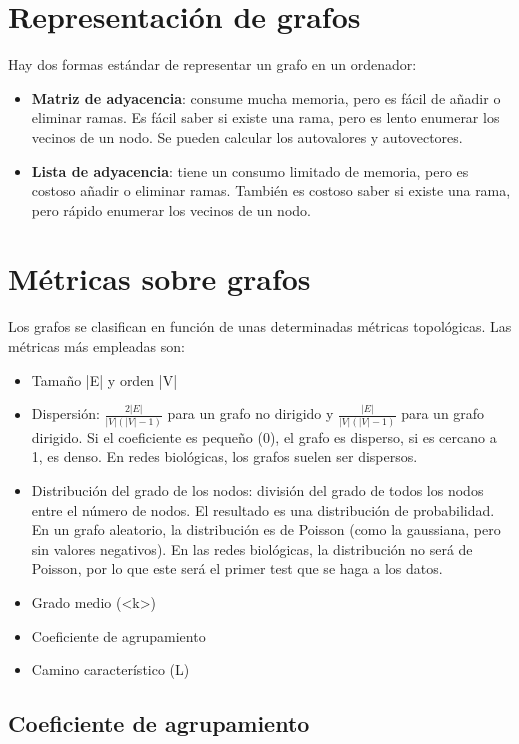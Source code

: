 \section{Representación de grafos}
Hay dos formas estándar de representar un grafo en un ordenador:
\begin{itemize}
\item \textbf{Matriz de adyacencia}: consume mucha memoria, pero es fácil de añadir o eliminar ramas. Es fácil saber si existe una rama, pero es lento enumerar los vecinos de un nodo. Se pueden calcular los autovalores y autovectores.
\item \textbf{Lista de adyacencia}: tiene un consumo limitado de memoria, pero es costoso añadir o eliminar ramas. También es costoso saber si existe una rama, pero rápido enumerar los vecinos de un nodo.
\end{itemize}

\section{Métricas sobre grafos}
Los grafos se clasifican en función de unas determinadas métricas topológicas. Las métricas más empleadas son:
\begin{itemize}
\item Tamaño |E| y orden |V|
\item Dispersión: $\frac{2 |E|}{|V| (|V| - 1)}$ para un grafo no dirigido y $\frac{|E|}{|V| (|V| - 1)}$ para un grafo dirigido. Si el coeficiente es pequeño (0), el grafo es disperso, si es cercano a 1, es denso. En redes biológicas, los grafos suelen ser dispersos.
\item Distribución del grado de los nodos: división del grado de todos los nodos entre el número de nodos. El resultado es una distribución de probabilidad. En un grafo aleatorio, la distribución es de Poisson (como la gaussiana, pero sin valores negativos). En las redes biológicas, la distribución no será de Poisson, por lo que este será el primer test que se haga a los datos. 
\item Grado medio (<k>)
\item Coeficiente de agrupamiento
\item Camino característico (L)
\end{itemize}

\subsection{Coeficiente de agrupamiento}



